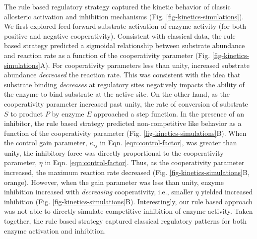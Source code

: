 \documentclass[12pt]{article}
\begin{document}
The rule based regulatory strategy captured the kinetic behavior of classic allosteric activation and inhibition mechanisms (Fig. \ref{fig-kinetics-simulations}).  
We first explored feed-forward substrate activation of enzyme activity (for both positive and negative cooperativity). 
Consistent with classical data, the rule based strategy predicted a sigmoidal relationship between substrate abundance 
and reaction rate as a function of the cooperativity parameter (Fig. \ref{fig-kinetics-simulations}A). 
For cooperativity parameters less than unity, increased substrate abundance \textit{decreased} the reaction rate. This was consistent with the idea that
substrate binding \textit{decreases} at regulatory sites negatively impacts the ability of the enzyme to bind substrate at the active site. 
On the other hand, as the cooperativity parameter increased past unity, the rate of conversion of substrate $S$ to product $P$ by enzyme $E$ approached a step function.
In the presence of an inhibitor, the rule based strategy predicted non-competitive like behavior as a function of the 
cooperativity parameter (Fig. \ref{fig-kinetics-simulations}B). 
When the control gain parameter, $\kappa_{ij}$ in Eqn. \eqref{eqn:control-factor}, was greater than unity, the inhibitory force was
directly proportional to the cooperativity parameter, $\eta$ in Eqn. \eqref{eqn:control-factor}. 
Thus, as the cooperativity parameter increased, the maximum reaction rate decreased (Fig. \ref{fig-kinetics-simulations}B, orange).
However, when the gain parameter was less than unity, enzyme inhibition increased with \textit{decreasing} cooperativity, 
i.e., smaller $\eta$ yielded increased inhibition (Fig. \ref{fig-kinetics-simulations}B).
Interestingly, our rule based approach was not able to directly simulate competitive inhibition of enzyme activity. 
Taken together, the rule based strategy captured classical regulatory patterns for both enzyme activation and inhibition. 
    
\end{document}
